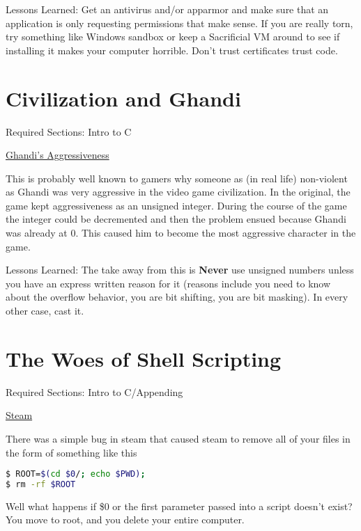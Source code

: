 Lessons Learned: Get an antivirus and/or apparmor and make sure that an application is only requesting permissions that make sense. If you are really torn, try something like Windows sandbox or keep a Sacrificial VM around to see if installing it makes your computer horrible. Don't trust certificates trust code.

\section{Civilization and Ghandi}

Required Sections: Intro to C

\href{https://www.geek.com/games/why-gandhi-is-always-a-warmongering-jerk-in-civilization-1608515/}{Ghandi's Aggressiveness}

This is probably well known to gamers why someone as (in real life) non-violent as Ghandi was very aggressive in the video game civilization. In the original, the game kept aggressiveness as an unsigned integer. During the course of the game the integer could be decremented and then the problem ensued because Ghandi was already at 0. This caused him to become the most aggressive character in the game.

Lessons Learned: The take away from this is \textbf{Never} use unsigned numbers unless you have an express written reason for it (reasons include you need to know about the overflow behavior, you are bit shifting, you are bit masking). In every other case, cast it.


\section{The Woes of Shell Scripting}

Required Sections: Intro to C/Appending

\href{https://www.pcworld.com/article/2871653/scary-steam-for-linux-bug-erases-all-the-personal-files-on-your-pc.html}{Steam}

There was a simple bug in steam that caused steam to remove all of your files in the form of something like this

\begin{lstlisting}[language=bash]
$ ROOT=$(cd $0/; echo $PWD);
$ rm -rf $ROOT
\end{lstlisting}

Well what happens if \$0 or the first parameter passed into a script doesn't exist? You move to root, and you delete your entire computer.

